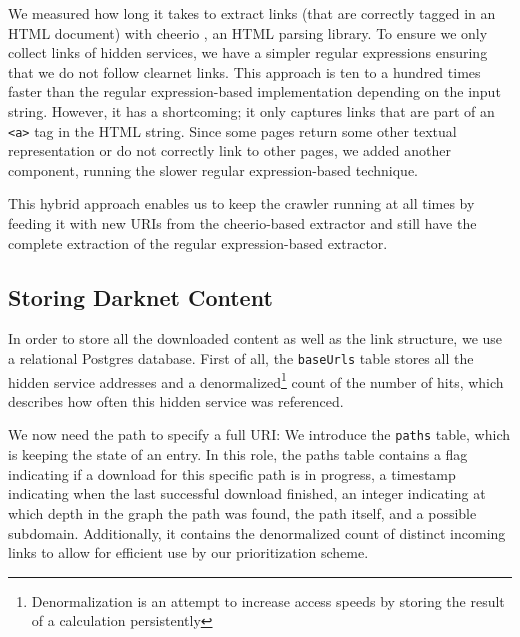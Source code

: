 We measured how long it takes to extract links (that are correctly tagged in an HTML document) with cheerio \cite{cheeriojs}, an HTML parsing library. To ensure we only collect links of hidden services, we have a simpler regular expressions ensuring that we do not follow clearnet links. This approach is ten to a hundred times faster than the regular expression-based implementation depending on the input string. However, it has a shortcoming; it only captures links that are part of an \texttt{<a>} tag in the HTML string. Since some pages return some other textual representation or do not correctly link to other pages, we added another component, running the slower regular expression-based technique.

This hybrid approach enables us to keep the crawler running at all times by feeding it with new URIs from the cheerio-based extractor and still have the complete extraction of the regular expression-based extractor.
%
%
\subsection{Storing Darknet Content}
In order to store all the downloaded content as well as the link structure, we use a relational Postgres database. First of all, the \texttt{baseUrls} table stores all the hidden service addresses and a denormalized\footnote{Denormalization is an attempt to increase access speeds by storing the result of a calculation persistently} count of the number of hits, which describes how often this hidden service was referenced.

We now need the path to specify a full URI: We introduce the \texttt{paths} table, which is keeping the state of an entry. In this role, the paths table contains a flag indicating if a download for this specific path is in progress, a timestamp indicating when the last successful download finished, an integer indicating at which depth in the graph the path was found, the path itself, and a possible subdomain. Additionally, it contains the denormalized count of distinct incoming links to allow for efficient use by our prioritization scheme.

